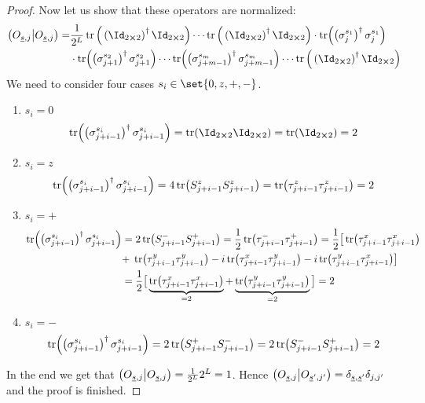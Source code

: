\begin{proof}
    Now let us show that these operators are normalized:
    \begin{align}
        \hs{O_{\underline{s},j}}{O_{\underline{s},j}} =& \frac{1}{\dimension} 
        \tr\Big(\left(\Id_{2\cross 2}\right)^{\dagger}\Id_{2\cross 2}\Big) \cdots 
        \tr\Big(\left(\Id_{2\cross 2}\right)^{\dagger}\Id_{2\cross 2}\Big)
        \cdot \tr(\left(\sigma_j^{s_1}\right)^{\dagger} \sigma_j^{s_1})\nonumber\\ 
        &\cdot \tr(\left(\sigma_{j+1}^{s_2}\right)^{\dagger} \sigma_{j+1}^{s_2})
        \cdots \tr(\left(\sigma_{j+m-1}^{s_m}\right)^{\dagger} \sigma_{j+m-1}^{s_m}) \cdots 
        \tr\Big(\left(\Id_{2\cross 2}\right)^{\dagger}\Id_{2\cross 2}\Big)
    \end{align}
    We need to consider four cases \(s_i\in \set{0,z,+,-}\).
    \begin{enumerate}
        \item {\(s_i = 0\)
        \begin{equation*}
            \tr(\left(\sigma_{j+i-1}^{s_i}\right)^{\dagger} \sigma_{j+i-1}^{s_i}) = \tr(\Id_{2\cross 2}\Id_{2\cross 2}) = 
            \tr(\Id_{2\cross 2}) = 2
        \end{equation*}
        }
        \item {\(s_i = z\)
        \begin{equation*}
            \tr(\left(\sigma_{j+i-1}^{s_i}\right)^{\dagger} \sigma_{j+i-1}^{s_i}) = 4\tr(S^{z}_{j+i-1} S^{z}_{j+i-1}) = 
            \tr(\tau_{j+i-1}^{z} \tau_{j+i-1}^{z}) = 2
        \end{equation*}
        }
        \item { \(s_i = +\)
        \begin{align*}
            \tr(\left(\sigma_{j+i-1}^{s_i}\right)^{\dagger} \sigma_{j+i-1}^{s_i}) =& \;2\tr(S^{-}_{j+i-1} S^{+}_{j+i-1}) =
            \frac{1}{2} \tr(\tau^{-}_{j+i-1}\tau^{+}_{j+i-1})  
            =\frac{1}{2} \big[\tr(\tau^{x}_{j+i-1}\tau^{x}_{j+i-1})\\
            +\;&\tr(\tau^{y}_{j+i-1}\tau^{y}_{j+i-1})
            - i\tr(\tau^{x}_{j+i-1}\tau^{y}_{j+i-1}) -i\tr(\tau^{y}_{j+i-1}\tau^{x}_{j+i-1})\big] \\
            =&\; \frac{1}{2}\big[  \underbrace{\tr(\tau^{x}_{j+i-1}\tau^{x}_{j+i-1})}_{=2}
            +\underbrace{\tr(\tau^{y}_{j+i-1}\tau^{y}_{j+i-1})}_{=2} \big] = 2
        \end{align*}
        }
        \item { \(s_i = -\)
        \begin{align*}
            \tr(\left(\sigma_{j+i-1}^{s_i}\right)^{\dagger} \sigma_{j+i-1}^{s_i}) =
             2\tr(S^{+}_{j+i-1} S^{-}_{j+i-1}) = 2\tr(S^{-}_{j+i-1} S^{+}_{j+i-1}) = 2 
        \end{align*}
        }
    \end{enumerate}
    In the end we get that \(\left(O_{\underline{s},j} \middle| O_{\underline{s},j}\right) = \frac{1}{2^L}2^L = 1\).
    Hence \( \left(O_{\underline{s},j} \middle| O_{\underline{s}^{\prime},j^{\prime}}\right)
    =\delta_{\underline{s},\underline{s}^{\prime}}\delta_{j,j^{\prime}}\) and the proof is finished.
\end{proof}